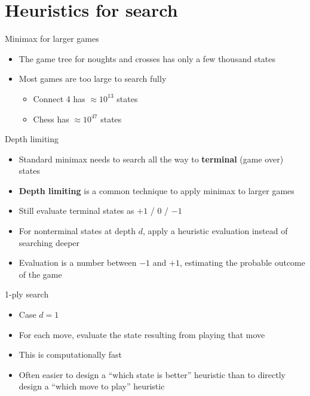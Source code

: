 \part{Heuristics for search}
\frame{\partpage}

\begin{frame}{Minimax for larger games}
	\begin{itemize}
		\pause\item The game tree for noughts and crosses has only a few thousand states
		\pause\item Most games are too large to search fully
			\begin{itemize}
				\pause\item Connect 4 has $\approx 10^{13}$ states
				\pause\item Chess has $\approx 10^{47}$ states
			\end{itemize}
	\end{itemize}
\end{frame}

\begin{frame}{Depth limiting}
	\begin{itemize}
		\pause\item Standard minimax needs to search all the way to \textbf{terminal} (game over) states
		\pause\item \textbf{Depth limiting} is a common technique to apply minimax to larger games
		\pause\item Still evaluate terminal states as $+1$ / $0$ / $-1$
		\pause\item For nonterminal states at depth $d$, apply a heuristic evaluation instead of searching deeper
		\pause\item Evaluation is a number between $-1$ and $+1$, estimating the probable outcome of the game
	\end{itemize}
\end{frame}

\begin{frame}{1-ply search}
	\begin{itemize}
		\pause\item Case $d=1$
		\pause\item For each move, evaluate the state resulting from playing that move
		\pause\item This is computationally fast
		\pause\item Often easier to design a ``which state is better'' heuristic than to directly design a ``which move to play'' heuristic
	\end{itemize}
\end{frame}

